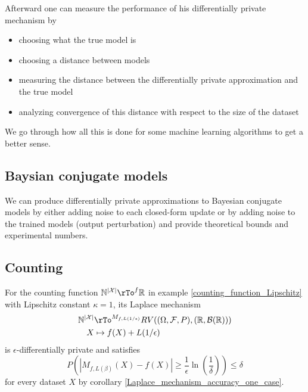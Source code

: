 \documentclass[12pt]{amsart}
\theoremstyle{definition}
\begin{document}
Afterward one can measure the performance of his differentially private mechanism by
\begin{itemize}
\item choosing what the true model is
\item choosing a distance between models
\item measuring the distance between the differentially private approximation and the true model
\item analyzing convergence of this distance with respect to the size of the dataset
\end{itemize}

We go through how all this is done for some machine learning algorithms to get a better sense.


\subsection{Baysian conjugate models} We can produce differentially private approximations to Bayesian conjugate models by either adding noise to each closed-form update or by adding noise to the trained models (output perturbation) and provide theoretical bounds and experimental numbers.

\subsection{Counting} \label{machine_learning_counting} For the counting function $\mathbb{N}^{|\mathcal{X}|} \rTo^f \mathbb{R}$ in example \ref{counting_function_Lipschitz} with Lipschitz constant $\kappa = 1$, its Laplace mechanism
\begin{align*}
\mathbb{N}^{|\mathcal{X}|} & \rTo^{M_{f, L(1 / \epsilon)}} RV((\Omega, \mathcal{F}, P), (\mathbb{R}, \mathcal{B}(\mathbb{R}))) \\
X & \mapsto f(X) + L(1 / \epsilon) \\
\end{align*}
is $\epsilon$-differentially private and satisfies
$$P\left( |M_{f, L(\beta)}(X) - f(X)| \geq \frac{1}{\epsilon} \ln \left( \frac{1}{\delta} \right) \right) \leq \delta$$
for every dataset $X$ by corollary \ref{Laplace_mechanism_accuracy_one_case}.
\end{document}
